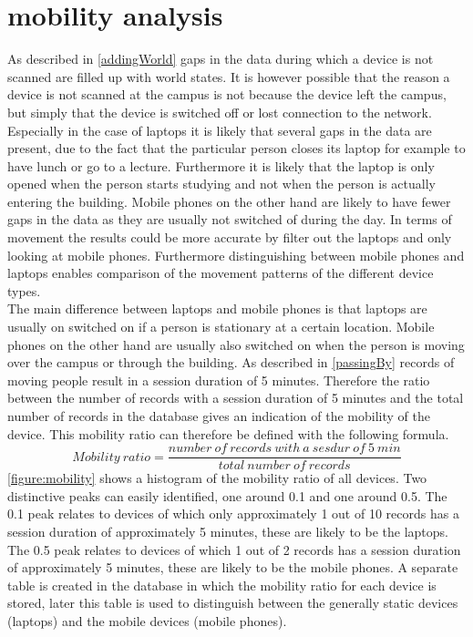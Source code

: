 \section{mobility analysis}\label{mobility}
As described in \autoref{addingWorld} gaps in the data during which a device is not scanned are filled up with world states. It is however possible that the reason a device is not scanned at the campus is not because the device left the campus, but simply that the device is switched off or lost connection to the network. Especially in the case of laptops it is likely that several gaps in the data are present, due to the fact that the particular person closes its laptop for example to have lunch or go to a lecture. Furthermore it is likely that the laptop is only opened when the person starts studying and not when the person is actually entering the building. Mobile phones on the other hand are likely to have fewer gaps in the data as they are usually not switched of during the day. In terms of movement the results could be more accurate by filter out the laptops and only looking at mobile phones. Furthermore distinguishing between mobile phones and laptops enables comparison of the movement patterns of the different device types. 
\\
The main difference between laptops and mobile phones is that laptops are usually on switched on if a person is stationary at a certain location. Mobile phones on the other hand are usually also switched on when the person is moving over the campus or through the building. As described in  \autoref{passingBy} records of moving people result in a session duration of 5 minutes. Therefore the ratio between the number of records with a session duration of 5 minutes and the total number of records in the database gives an indication of the mobility of the device. This mobility ratio can therefore be defined with the following formula.
\[
    Mobility\ ratio = \frac{number\ of\ records\ with\ a\ sesdur\ of\ 5\ min}{total\ number\ of\ records}
\]   
\autoref{figure:mobility} shows a histogram of the mobility ratio of all devices. Two distinctive peaks can easily identified, one around 0.1 and one around 0.5. The 0.1 peak relates to devices of which only approximately 1 out of 10 records has a session duration of approximately 5 minutes, these are likely to be the laptops. The 0.5 peak relates to devices of which 1 out of 2 records has a session duration of approximately 5 minutes, these are likely to be the mobile phones. A separate table is created in the database in which the mobility ratio for each device is stored, later this table is used to distinguish between the generally static devices (laptops) and the mobile devices (mobile phones). 

